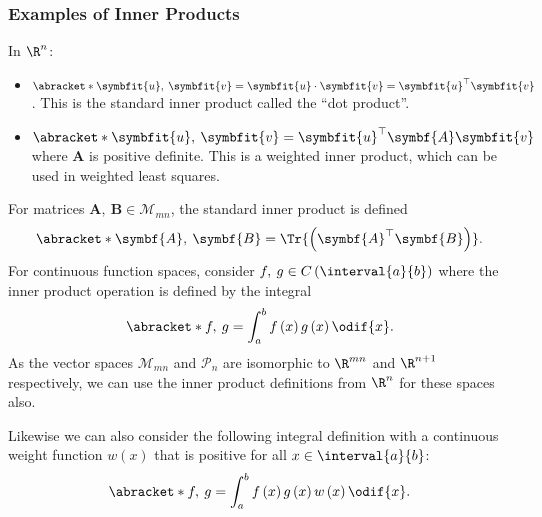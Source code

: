 \documentclass{article}
\begin{document}
\begin{multicols*}{3}
    \subsubsection{Examples of Inner Products}
    In \(\R^n\):
    \begin{itemize}
        \item \(\abracket*{\symbfit{u},\: \symbfit{v}} = \symbfit{u} \cdot \symbfit{v} = \symbfit{u}^\top \symbfit{v}\). This is the standard inner product called the ``dot product''.
        \item \(\abracket*{\symbfit{u},\: \symbfit{v}} = \symbfit{u}^\top \symbf{A} \symbfit{v}\) where \(\symbf{A}\) is positive definite. This is a weighted inner product, which can be used in weighted least squares.
    \end{itemize}
    For matrices \(\symbf{A},\: \symbf{B} \in \mathscr{M}_{mn}\), the standard inner product is defined
    \begin{equation*}
        \abracket*{\symbf{A},\: \symbf{B}} = \Tr{\left( \symbf{A}^\top \symbf{B} \right)}.
    \end{equation*}
    For continuous function spaces, consider \(f,\: g \in C\left( \interval{a}{b} \right)\) where
    the inner product operation is defined by the integral
    \begin{equation*}
        \abracket*{f,\: g} = \int_a^b f\left( x \right) g\left( x \right) \odif{x}.
    \end{equation*}
    As the vector spaces \(\mathscr{M}_{mn}\) and \(\mathscr{P}_n\) are isomorphic to \(\R^{mn}\) and \(\R^{n + 1}\) respectively,
    we can use the inner product definitions from \(\R^n\) for these spaces also.

    Likewise we can also consider the following integral definition with a continuous weight function \(w\left( x \right)\) that is positive for all \(x \in \interval{a}{b}\):
    \begin{equation*}
        \abracket*{f,\: g} = \int_a^b f\left( x \right) g\left( x \right) w\left( x \right) \odif{x}.
    \end{equation*}

\end{multicols*}
\end{document}
